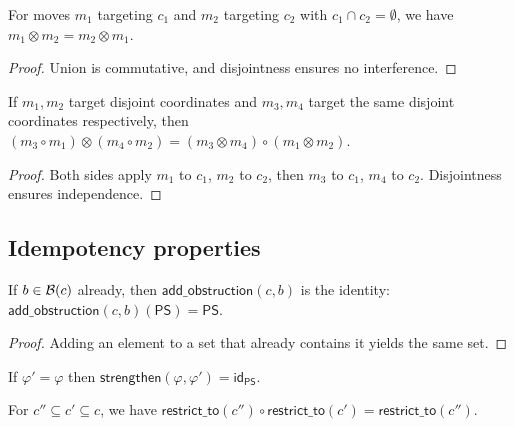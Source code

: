 \documentclass[11pt]{article}
\newcommand{\PS}{\mathsf{PS}}
\begin{document}
\begin{proposition}\label{prop:sym}
For moves $m_1$ targeting $c_1$ and $m_2$ targeting $c_2$ with
$c_1 \cap c_2 = \emptyset$, we have $m_1 \otimes m_2 = m_2 \otimes m_1$.
\end{proposition}

\begin{proof}
Union is commutative, and disjointness ensures no interference.
\end{proof}

\begin{proposition}\label{prop:interchange}
If $m_1, m_2$ target disjoint coordinates and $m_3, m_4$ target
the same disjoint coordinates respectively, then
$(m_3 \circ m_1) \otimes (m_4 \circ m_2) =
(m_3 \otimes m_4) \circ (m_1 \otimes m_2)$.
\end{proposition}

\begin{proof}
Both sides apply $m_1$ to $c_1$, $m_2$ to $c_2$, then $m_3$ to
$c_1$, $m_4$ to $c_2$.  Disjointness ensures independence.
\end{proof}

\subsection{Idempotency properties}

\begin{lemma}\label{lem:idemp-obstr}
If $b \in \mathcal{B}(c)$ already, then $\mathsf{add\_obstruction}(c, b)$
is the identity: $\mathsf{add\_obstruction}(c,b)(\PS) = \PS$.
\end{lemma}

\begin{proof}
Adding an element to a set that already contains it yields
the same set.
\end{proof}

\begin{lemma}\label{lem:idemp-str}
If $\varphi' = \varphi$ then $\mathsf{strengthen}(\varphi, \varphi')
= \mathsf{id}_{\PS}$.
\end{lemma}

\begin{lemma}\label{lem:double-restrict}
For $c'' \subseteq c' \subseteq c$, we have
$\mathsf{restrict\_to}(c'') \circ \mathsf{restrict\_to}(c')
= \mathsf{restrict\_to}(c'')$.
\end{lemma}
\end{document}
